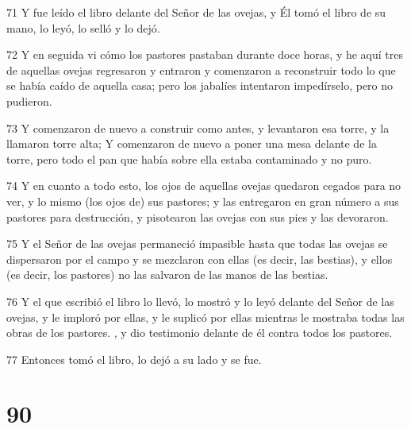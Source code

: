 \par 71 Y fue leído el libro delante del Señor de las ovejas, y Él tomó el libro de su mano, lo leyó, lo selló y lo dejó.
\par 72 Y en seguida vi cómo los pastores pastaban durante doce horas, y he aquí tres de aquellas ovejas regresaron y entraron y comenzaron a reconstruir todo lo que se había caído de aquella casa; pero los jabalíes intentaron impedírselo, pero no pudieron.
\par 73 Y comenzaron de nuevo a construir como antes, y levantaron esa torre, y la llamaron torre alta; Y comenzaron de nuevo a poner una mesa delante de la torre, pero todo el pan que había sobre ella estaba contaminado y no puro.
\par 74 Y en cuanto a todo esto, los ojos de aquellas ovejas quedaron cegados para no ver, y lo mismo (los ojos de) sus pastores; y las entregaron en gran número a sus pastores para destrucción, y pisotearon las ovejas con sus pies y las devoraron.
\par 75 Y el Señor de las ovejas permaneció impasible hasta que todas las ovejas se dispersaron por el campo y se mezclaron con ellas (es decir, las bestias), y ellos (es decir, los pastores) no las salvaron de las manos de las bestias.
\par 76 Y el que escribió el libro lo llevó, lo mostró y lo leyó delante del Señor de las ovejas, y le imploró por ellas, y le suplicó por ellas mientras le mostraba todas las obras de los pastores. , y dio testimonio delante de él contra todos los pastores.
\par 77 Entonces tomó el libro, lo dejó a su lado y se fue.

\chapter{90}

